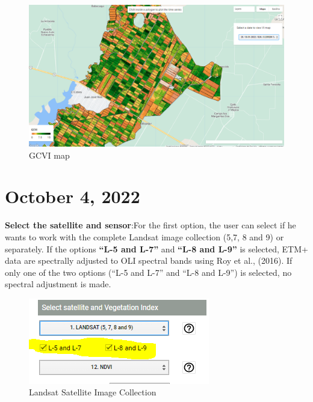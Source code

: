 \documentclass[
]{book}
\begin{document}
\begin{figure}

{\centering \includegraphics{./images/FigureA0} 

}

\caption{GCVI map}\label{fig:figA0}
\end{figure}

\hypertarget{october-4-2022}{%
\section{October 4, 2022}\label{october-4-2022}}

\textbf{Select the satellite and sensor}:For the first option, the user can select if he wants to work with the complete Landsat image collection (5,7, 8 and 9) or separately. If the options \textbf{``L-5 and L-7''} and \textbf{``L-8 and L-9''} is selected, ETM+ data are spectrally adjusted to OLI spectral bands using Roy et al., (2016). If only one of the two options (``L-5 and L-7'' and ``L-8 and L-9'') is selected, no spectral adjustment is made.

\begin{figure}

{\centering \includegraphics{./images/FigureA1} 

}

\caption{Landsat Satellite Image Collection}\label{fig:figA1}
\end{figure}
\end{document}
